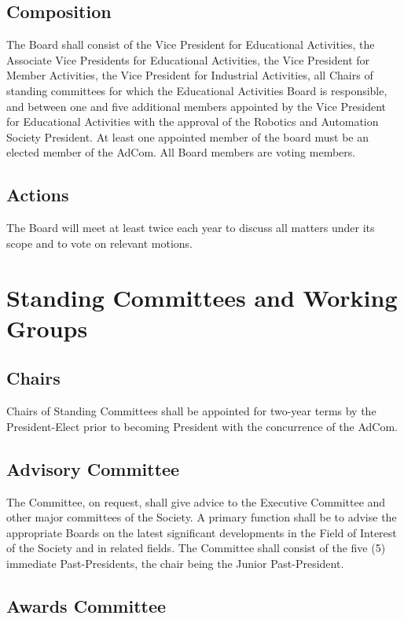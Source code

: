 \documentclass[10pt]{article}
\begin{document}
\subsection{Composition}

The Board shall consist of the Vice President for Educational Activities, the Associate Vice Presidents for Educational Activities, the Vice President for Member Activities, the Vice President for Industrial Activities, all Chairs of standing committees for which the Educational Activities Board is responsible, and between one and five additional members appointed by the Vice President for Educational Activities with the approval of the Robotics and Automation Society President. At least one appointed member of the board must be an elected member of the AdCom. All Board members are voting members. 

\subsection{Actions}
The Board will meet at least twice each year to discuss all matters under its scope and to vote on relevant motions.


\section{Standing Committees and Working Groups}
\label{StandingCommittees}

\subsection{Chairs}

Chairs of Standing Committees shall be appointed for two-year terms by the President-Elect prior to becoming President with the concurrence of the AdCom.

\subsection{Advisory Committee}

The Committee, on request, shall give advice to the Executive Committee and other major committees of the Society. A primary function shall be to advise the appropriate Boards on the latest significant developments in the Field of Interest of the Society and in related fields. The Committee shall consist of the five (5) immediate Past-Presidents, the chair being the Junior Past-President.

\subsection{Awards Committee}
\end{document}
